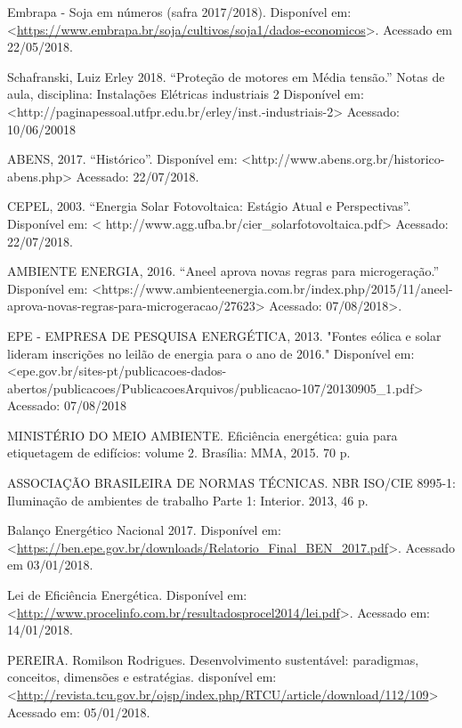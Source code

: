 \begin{thebibliography}{3}


{Embrapa - Soja em números (safra 2017/2018). Disponível em: <\url{https://www.embrapa.br/soja/cultivos/soja1/dados-economicos}>. Acessado em 22/05/2018.}

{Schafranski, Luiz Erley 2018. “Proteção de motores em Média tensão.” Notas de aula, disciplina: Instalações Elétricas industriais 2 Disponível em: <http://paginapessoal.utfpr.edu.br/erley/inst.-industriais-2>  Acessado: 10/06/20018}

{ABENS, 2017. “Histórico”. Disponível em: <http://www.abens.org.br/historico-abens.php> Acessado: 22/07/2018.}

{CEPEL, 2003. “Energia Solar Fotovoltaica: Estágio Atual e Perspectivas”. Disponível em: < http://www.agg.ufba.br/cier_solarfotovoltaica.pdf> Acessado: 22/07/2018.
}

{AMBIENTE ENERGIA, 2016. “Aneel aprova novas regras para microgeração.” Disponível em: <https://www.ambienteenergia.com.br/index.php/2015/11/aneel-aprova-novas-regras-para-microgeracao/27623> Acessado: 07/08/2018>.
}

{EPE - EMPRESA DE PESQUISA ENERGÉTICA, 2013. "Fontes eólica e solar lideram inscrições no leilão de energia para o ano de 2016." Disponível em: <epe.gov.br/sites-pt/publicacoes-dados-abertos/publicacoes/PublicacoesArquivos/publicacao-107/20130905_1.pdf> Acessado: 07/08/2018}

{MINISTÉRIO DO MEIO AMBIENTE. Eficiência energética: guia para etiquetagem de edifícios: volume 2. Brasília: MMA, 2015. 70 p.}

{ASSOCIAÇÃO BRASILEIRA DE NORMAS TÉCNICAS. NBR ISO/CIE 8995-1: Iluminação de ambientes de trabalho Parte 1: Interior. 2013, 46 p.}

{Balanço Energético Nacional 2017. Disponível em: <\url{https://ben.epe.gov.br/downloads/Relatorio_Final_BEN_2017.pdf}>. Acessado em 03/01/2018.}

{Lei de Eficiência Energética. Disponível em: <\url{http://www.procelinfo.com.br/resultadosprocel2014/lei.pdf}>. Acessado em: 14/01/2018.}

{PEREIRA. Romilson Rodrigues. Desenvolvimento sustentável: paradigmas, conceitos, dimensões e estratégias. disponível em:  <\url{http://revista.tcu.gov.br/ojsp/index.php/RTCU/article/download/112/109}> Acessado em: 05/01/2018.}


\end{thebibliography}
